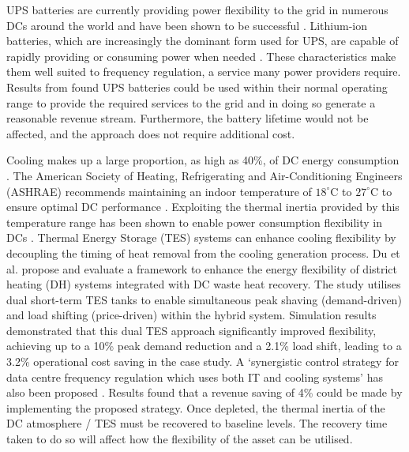\documentclass[lettersize,journal]{IEEEtran}
\begin{document}
UPS batteries are currently providing power flexibility to the grid in numerous DCs around the world and have been shown to be successful \cite{alapera2019fast,roach2022microsoft,Anghel_2023}. Lithium-ion batteries, which are increasingly the dominant form used for UPS, are capable of rapidly providing or consuming power when needed \cite{alapera2018data}. These characteristics make them well suited to frequency regulation, a service many power providers require. Results from \cite{alapera2018data} found UPS batteries could be used within their normal operating range to provide the required services to the grid and in doing so generate a reasonable revenue stream. Furthermore, the battery lifetime would not be affected, and the approach does not require additional cost.

Cooling makes up a large proportion, as high as 40\%, of DC energy consumption \cite{zhao2021synthetic}.  The American Society of Heating, Refrigerating and Air-Conditioning Engineers (ASHRAE) recommends maintaining an indoor temperature of $18^\circ\mathrm{C}$ to $27^\circ\mathrm{C}$ to ensure optimal DC performance \cite{tc2016data}. Exploiting the thermal inertia provided by this temperature range has been shown to enable power consumption flexibility in DCs \cite{takci2025data}\cite{ref22}. Thermal Energy Storage (TES) systems can enhance cooling flexibility by decoupling the timing of heat removal from the cooling generation process.
Du et al. \cite{du2025new} propose and evaluate a framework to enhance the energy flexibility of district heating (DH) systems integrated with DC waste heat recovery. The study utilises dual short-term TES tanks to enable simultaneous peak shaving (demand-driven) and load shifting (price-driven) within the hybrid system. Simulation results demonstrated that this dual TES approach significantly improved flexibility, achieving up to a 10\% peak demand reduction and a 2.1\% load shift, leading to a 3.2\% operational cost saving in the case study. A `synergistic control strategy for data centre frequency regulation which uses both IT and cooling systems' has also been proposed \cite{fu2020assessments}. Results found that a revenue saving of 4\% could be made by implementing the proposed strategy. Once depleted, the thermal inertia of the DC atmosphere / TES must be recovered to baseline levels. The recovery time taken to do so will affect how the flexibility of the asset can be utilised.
\end{document}
